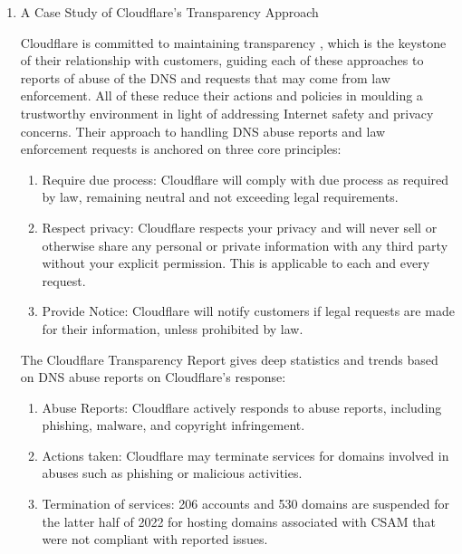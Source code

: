 \begin{enumerate}
    \item A Case Study of Cloudflare's Transparency Approach



Cloudflare is committed to maintaining transparency \cite{cloudflare_transparency_2022}, which is the keystone of their relationship with customers, guiding each of these approaches to reports of abuse of the DNS and requests that may come from law enforcement. All of these reduce their actions and policies in moulding a trustworthy environment in light of addressing Internet safety and privacy concerns. Their approach to handling DNS abuse reports and law enforcement requests is anchored on three core principles:


\begin{enumerate}
    \item Require due process: Cloudflare will comply with due process as required by law, remaining neutral and not exceeding legal requirements.
    
    \item Respect privacy: Cloudflare respects your privacy and will never sell or otherwise share any personal or private information with any third party without your explicit permission. This is applicable to each and every request.
    
    \item Provide Notice: Cloudflare will notify customers if legal requests are made for their information, unless prohibited by law.

\end{enumerate}

The Cloudflare Transparency Report gives deep statistics and trends based on DNS abuse reports on Cloudflare's response: 

\begin{enumerate}
    \item Abuse Reports: Cloudflare actively responds to abuse reports, including phishing, malware, and copyright infringement.

    \item Actions taken: Cloudflare may terminate services for domains involved in abuses such as phishing or malicious activities.
    
    \item Termination of services: 206 accounts and 530 domains are suspended for the latter half of 2022 for hosting domains associated with CSAM that were not compliant with reported issues.
    

\end{enumerate}
\end{enumerate}
